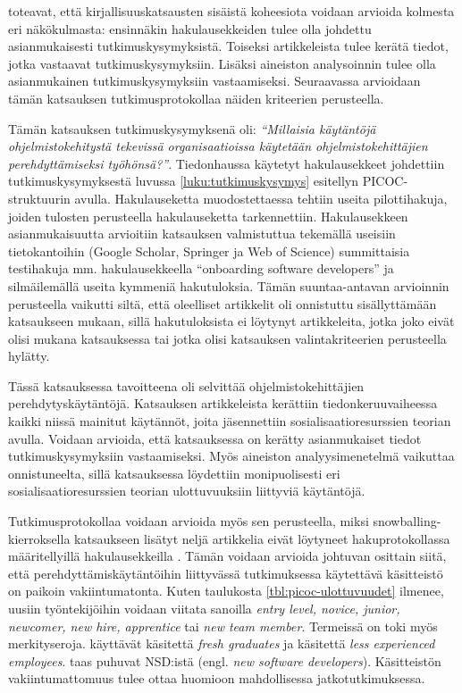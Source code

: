 \documentclass[utf8]{gradu3}
\begin{document}
\textcite{kitchenham-charters-2007} toteavat, että kirjallisuuskatsausten sisäistä koheesiota voidaan arvioida kolmesta eri näkökulmasta: ensinnäkin hakulausekkeiden tulee olla johdettu asianmukaisesti tutkimuskysymyksistä. Toiseksi artikkeleista tulee kerätä tiedot, jotka vastaavat tutkimuskysymyksiin. Lisäksi aineiston analysoinnin tulee olla asianmukainen tutkimuskysymyksiin vastaamiseksi. Seuraavassa arvioidaan tämän katsauksen tutkimusprotokollaa näiden kriteerien perusteella.

Tämän katsauksen tutkimuskysymyksenä oli: \textit{“Millaisia käytäntöjä ohjelmistokehitystä tekevissä organisaatioissa käytetään ohjelmistokehittäjien perehdyttämiseksi työhönsä?”}. Tiedonhaussa käytetyt hakulausekkeet johdettiin tutkimuskysymyksestä luvussa \ref{luku:tutkimuskysymys} esitellyn PICOC-struktuurin avulla. Hakulauseketta muodostettaessa tehtiin useita pilottihakuja, joiden tulosten perusteella hakulauseketta tarkennettiin. Hakulausekkeen asianmukaisuutta arvioitiin katsauksen valmistuttua tekemällä useisiin tietokantoihin (Google Scholar, Springer ja Web of Science) summittaisia testihakuja mm. hakulausekkeella “onboarding software developers” ja silmäilemällä useita kymmeniä hakutuloksia. Tämän suuntaa-antavan arvioinnin perusteella vaikutti siltä, että oleelliset artikkelit oli onnistuttu sisällyttämään katsaukseen mukaan, sillä hakutuloksista ei löytynyt artikkeleita, jotka joko eivät olisi mukana katsauksessa tai jotka olisi katsauksen valintakriteerien perusteella hylätty.

Tässä katsauksessa tavoitteena oli selvittää ohjelmistokehittäjien perehdytyskäytäntöjä. Katsauksen artikkeleista kerättiin tiedonkeruuvaiheessa kaikki niissä mainitut käytännöt, joita jäsennettiin sosialisaatioresurssien teorian avulla. Voidaan arvioida, että katsauksessa on kerätty asianmukaiset tiedot tutkimuskysymyksiin vastaamiseksi. Myös aineiston analyysimenetelmä vaikuttaa onnistuneelta, sillä katsauksessa löydettiin monipuolisesti eri sosialisaatioresurssien teorian ulottuvuuksiin liittyviä käytäntöjä.

Tutkimusprotokollaa voidaan arvioida myös sen perusteella, miksi snowballing-kierroksella katsaukseen lisätyt neljä artikkelia eivät löytyneet hakuprotokollassa määritellyillä hakulausekkeilla %
\parencites%
    {bjornson-dingsøyr-2005}%
    {kulkarni-ym-2010}%
    {hemphill-begel-2011}%
    {viviani-murphy-2019}%
\relax.
%
Tämän voidaan arvioida johtuvan osittain siitä, että perehdyttämiskäytäntöihin liittyvässä tutkimuksessa käytettävä käsitteistö on paikoin vakiintumatonta. Kuten taulukosta \ref{tbl:picoc-ulottuvuudet} ilmenee, uusiin työntekijöihin voidaan viitata sanoilla \textit{entry level, novice, junior, newcomer, new hire, apprentice} tai \textit{new team member}. Termeissä on toki myös merkityseroja. \textcite{kulkarni-ym-2010} käyttävät käsitettä \textit{fresh graduates} ja \textcite{bjornson-dingsøyr-2005} käsitettä \textit{less experienced employees}. \textcite{begel-simon-2008} taas puhuvat NSD:istä (engl. \textit{new software developers}). Käsitteistön vakiintumattomuus tulee ottaa huomioon mahdollisessa jatkotutkimuksessa. 
\end{document}
